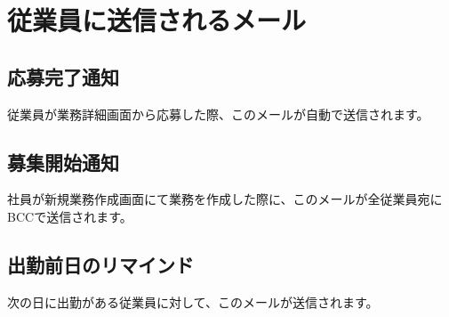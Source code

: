 \documentclass[11pt, a4paper]{jarticle}
\begin{document}
\section{従業員に送信されるメール}
	\subsection{応募完了通知}
		\begin{figure}[htbp]
			\centering
		\end{figure}
		従業員が業務詳細画面から応募した際、このメールが自動で送信されます。

	\subsection{募集開始通知}
		\begin{figure}[htbp]
			\centering
		\end{figure}
		社員が新規業務作成画面にて業務を作成した際に、このメールが全従業員宛にBCCで送信されます。

	\subsection{出勤前日のリマインド}
		\begin{figure}[htbp]
			\centering
		\end{figure}
		次の日に出勤がある従業員に対して、このメールが送信されます。
\end{document}
